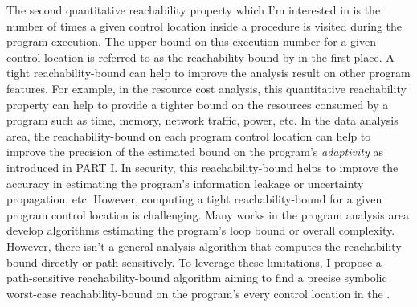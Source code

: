 The second quantitative reachability property which I'm interested in is 
the number of times a given control location 
 inside a procedure is visited during the program execution.
    The upper bound on this execution number for 
a given control location is referred to as the reachability-bound by \cite{GulwaniZ10} in the first place.
A tight reachability-bound
can help to improve the analysis result on other program features.
For example, in the resource cost analysis, this quantitative reachability property
can help to provide a tighter
bound on the resources consumed by a program such as time, memory,
network traffic, power, etc.
In the data analysis area,
the reachability-bound on each program control location
can help to improve the precision of the estimated bound on the program's \emph{adaptivity} as introduced in PART I.
In security, this reachability-bound helps to improve the accuracy
in estimating the program's information leakage or uncertainty propagation, etc.
However, computing a tight reachability-bound for a given program control location is challenging.
Many works in the program analysis area develop algorithms estimating the program's loop bound or overall complexity.
However, there isn't a general analysis algorithm that
computes the reachability-bound
directly or path-sensitively.
To leverage these limitations,
I propose a path-sensitive reachability-bound algorithm
aiming to find a precise symbolic worst-case reachability-bound on the program's every control location
in the .

